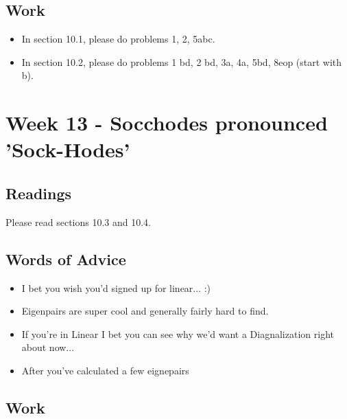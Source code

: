 	\subsection{Work}
		\begin{itemize}
			\item In section 10.1, please do problems 1, 2, 5abc.
			\item In section 10.2, please do problems 1 bd, 2 bd, 3a, 4a, 5bd, 8eop (start with b).
		\end{itemize}

	\clearpage



	\section{Week 13 - Socchodes pronounced 'Sock-Hodes'}

	\subsection{Readings}
		Please read sections 10.3 and 10.4.

	\subsection{Words of Advice}
		\begin{itemize}
			\item I bet you wish you'd signed up for linear... :)
			\item Eigenpairs are super cool and generally fairly hard to find.
			\item If you're in Linear I bet you can see why we'd want a Diagnalization right about now...
			\item After you've calculated a few eignepairs 
		\end{itemize}

	\subsection{Work}

